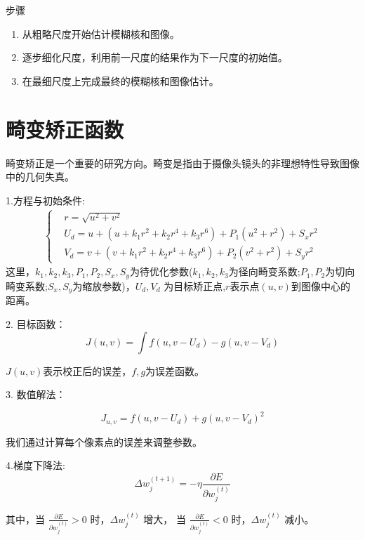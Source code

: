 \documentclass{lzureport}
\begin{document}
步骤
\begin{enumerate}[label=\arabic*)]
	\item 从粗略尺度开始估计模糊核和图像。
	\item 逐步细化尺度，利用前一尺度的结果作为下一尺度的初始值。
	\item 在最细尺度上完成最终的模糊核和图像估计。
\end{enumerate}

\newpage
\section{畸变矫正函数}
畸变矫正是一个重要的研究方向。畸变是指由于摄像头镜头的非理想特性导致图像中的几何失真。

1.方程与初始条件:
$$\begin{aligned}
	\left\{\begin{matrix}
	&r=\sqrt{u^2+v^2}\\
	&U_d=u+(u+k_1r^2+k_2r^4+k_3r^6)+P_1(u^2+r^2)+S_xr^2\\
	&V_d=v+(v+k_1r^2+k_2r^4+k_3r^6)+P_2(v^2+r^2)+S_yr^2
	\end{matrix}\right.
	\end{aligned}$$
	这里，$k_1,k_2,k_3,P_1,P_2,S_x,S_y$为待优化参数($k_1,k_2,k_3$为径向畸变系数;$P_1,P_2$为切向畸变系数;$S_x,S_y$为缩放参数)，$U_d,V_d$ 为目标矫正点,$r$表示点$(u,v)$到图像中心的距离。


2. 目标函数：
	$$J(u,v)=\int f(u,v-U_d)-g(u,v-V_d)$$

	$J(u,v)$表示校正后的误差，$f,g$为误差函数。

3. 数值解法：

$$J_{u,v}=f(u,v-U_d)+g(u,v-V_d)^2$$

我们通过计算每个像素点的误差来调整参数。

4.梯度下降法:
$$\Delta w_j^{(t+1)}=-\eta\frac{\partial E}{\partial w_j^{(t)}}$$	

其中，当 $\frac{\partial E}{\partial w_j^{(t)}} > 0$ 时，$\Delta w_j^{(t)}$ 增大，
当 $\frac{\partial E}{\partial w_j^{(t)}} < 0$ 时，$\Delta w_j^{(t)}$ 减小。
\end{document}
